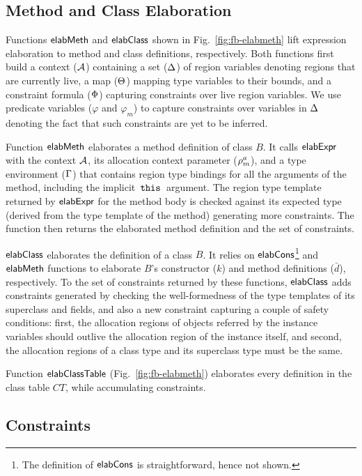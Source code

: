 \subsection{Method and Class Elaboration}

Functions ${\sf elabMeth}$ and ${\sf elabClass}$ shown in
Fig.~\ref{fig:fb-elabmeth} lift expression elaboration to method and
class definitions, respectively. Both functions first build a context
(${\mathcal{A}}$) containing a set ($ \Delta$) of region variables denoting
regions that are currently live, a map ($\Theta$) mapping type
variables to their bounds, and a constraint formula ($\Phi$)
capturing constraints over live region variables. We use predicate
variables ($\varphi$ and $\varphi_m$) to capture constraints over
variables in $\Delta$ denoting the fact that such constraints are yet
to be inferred.

Function ${\sf elabMeth}$ elaborates a method definition of class $B$. It
calls ${\sf elabExpr}$ with the context ${\mathcal{A}}$, its allocation context
parameter ($\rho^a_m$), and a type environment ($\Gamma$) that
contains region type bindings for all the arguments of the method,
including the implicit $\,{\tt this}\,$ argument. The region type template
returned by ${\sf elabExpr}$ for the method body is checked against its
expected type (derived from the type template of the method)
generating more constraints. The function then returns the elaborated
method definition and the set of constraints.

${\sf elabClass}$ elaborates the definition of a class $B$. It relies on
${\sf elabCons}$\footnote{The definition of ${\sf elabCons}$ is straightforward,
hence not shown.} and ${\sf elabMeth}$ functions to elaborate $B$'s
constructor ($k$) and method definitions ($\bar{d}$), respectively. To
the set of constraints returned by these functions, ${\sf elabClass}$ adds
constraints generated by checking the well-formedness of the type
templates of its superclass and fields, and also a new constraint
capturing a couple of safety conditions: first, the allocation regions
of objects referred by the instance variables should outlive the
allocation region of the instance itself, and second, the allocation
regions of a class type and its superclass type must be the same.

Function ${\sf elabClassTable}$ (Fig.~\ref{fig:fb-elabmeth}) elaborates
every definition in the class table $CT$, while accumulating
constraints.

\subsection{Constraints}
\label{sec:fb-constraintsem}

